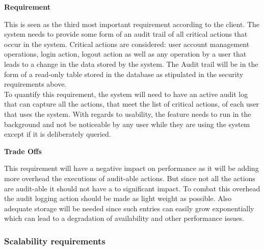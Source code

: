\begin{flushleft}
\vspace{0.1in}

\textbf{Requirement}

This is seen as the third most important requirement according to the client. The system needs to provide some form of an audit trail of all critical actions that occur in the system. Critical actions are considered: user account management operations, login action, logout action as well as any operation by a user that leads to a change in the data stored by the system. The Audit trail will be in the form of a read-only table stored in the database as stipulated in the security requirements above.\\

To quantify this requirement, the system will need to have an active audit log that can capture all the actions, that meet the list of critical actions, of each user that uses the system. With regards to usability, the feature needs to run in the background and not be noticeable by any user while they are using the system except if it is deliberately queried.
\vspace{0.1in}


\textbf{Trade Offs}

This requirement will have a negative impact on performance as it will be adding more overhead the executions of audit-able actions. But since not all the actions are audit-able it should not have a to significant impact. To combat this overhead the audit logging action should be made as light weight as possible. Also adequate storage will be needed since such entries can easily grow exponentially which can lead to a degradation of availability and other performance issues.  

\vspace{0.1in}


\end{flushleft}

\subsubsection{Scalability requirements}

